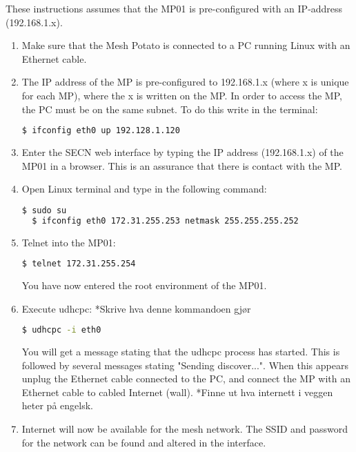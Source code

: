 
These instructions assumes that the MP01 is pre-configured with an IP-address (192.168.1.x). 

\begin{enumerate}
\item Make sure that the Mesh Potato is connected to a PC running Linux with an Ethernet cable. 
\item The IP address of the MP is pre-configured to 192.168.1.x (where x is unique for each MP), where the x is written on the MP. In order to access the MP, the PC must be on the same subnet. To do this write in the terminal: 
\noindent
\begin{lstlisting}[language=bash]
  $ ifconfig eth0 up 192.128.1.120
\end{lstlisting}
\item Enter the SECN web interface by typing the IP address (192.168.1.x) of the MP01 in a browser. This is an assurance that there is contact with the MP. 
\item Open Linux terminal and type in the following command: 
\noindent
\begin{lstlisting}[language=bash]
  $ sudo su
  $ ifconfig eth0 172.31.255.253 netmask 255.255.255.252 
\end{lstlisting}
\item Telnet into the MP01:
\noindent
\begin{lstlisting}[language=bash]
  $ telnet 172.31.255.254 
\end{lstlisting}
You have now entered the root environment of the MP01. 
\item Execute udhcpc: 
*Skrive hva denne kommandoen gjør
\noindent
\begin{lstlisting}[language=bash]
  $ udhcpc -i eth0 
\end{lstlisting}
You will get a message stating that the udhcpc process has started. This is followed by several messages stating "Sending discover...". When this appears unplug the Ethernet cable connected to the PC, and connect the MP with an Ethernet cable to cabled Internet (wall). 
*Finne ut hva internett i veggen heter på engelsk.
\item Internet will now be available for the mesh network. The SSID and password for the network can be found and altered in the interface. 
\end{enumerate}

